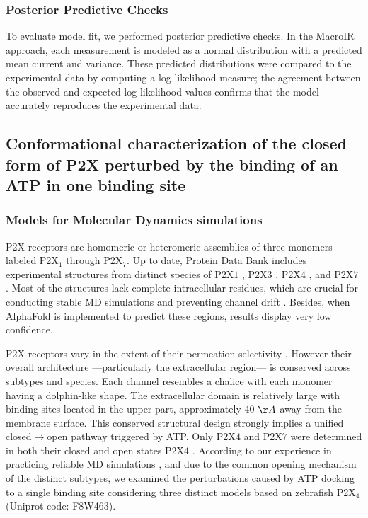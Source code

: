 \documentclass[pdflatex,sn-nature]{sn-jnl}%
\begin{document}
\subsubsection{Posterior Predictive Checks}  
To evaluate model fit, we performed posterior predictive checks. In the MacroIR approach, each measurement is modeled as a normal distribution with a predicted mean current and variance. These predicted distributions were compared to the experimental data by computing a log-likelihood measure; the agreement between the observed and expected log-likelihood values confirms that the model accurately reproduces the experimental data.

\subsection{Conformational characterization of the closed form of P2X perturbed by the binding of an ATP in one binding site}

\subsubsection{Models for Molecular Dynamics simulations}
\label{sec:model_const}

P2X receptors are homomeric or heteromeric assemblies of three monomers labeled P2X${_1}$ through P2X${_7}$. Up to date, Protein Data Bank includes experimental structures from distinct species of P2X${1}$ \cite{bennetts2024structural}, P2X${3}$ \cite{cristal_p2x3, wang2018,li2019,thach2025mechanistic,kim2024discovery}, P2X${4}$ \cite{abierta_p2x,cerrada_p2x,shen2023structural,shi2025human}, and P2X${7}$ \cite{mccarthy2019full,binding_zn_2016,karasawa2016,sheng2024structural,oken2024high,oken2024p2x7}. Most of the structures lack complete intracellular residues, which are crucial for conducting stable MD simulations and preventing channel drift \cite{piedominici_p2x_1}. Besides, when AlphaFold \cite{af3} is implemented to predict these regions, results display very low confidence.  


P2X receptors vary in the extent of their permeation selectivity \cite{samways2014principles}. However their overall architecture —particularly the extracellular region— is conserved across subtypes and species. 
Each channel resembles a chalice with each monomer having a dolphin-like shape. The extracellular domain is relatively large with binding sites located in the upper part, approximately 40 $\AA$ away from the membrane surface.
This conserved structural design strongly implies a unified closed$\rightarrow$open pathway triggered by ATP.
Only P2X${4}$ and P2X${7}$ were determined in both their closed and open states P2X${4}$ \cite{abierta_p2x,cerrada_p2x,mccarthy2019full,karasawa2016,sheng2024structural}. According to our experience in practicing reliable MD simulations \cite{piedominici_p2x_1,racigh2021, pierdominici2019charge,racigh2019positively}, and due to the common opening mechanism of the distinct subtypes, we examined the perturbations caused by ATP docking to a single binding site considering three distinct models based on zebrafish P2X${_4}$ (Uniprot code: F8W463).
\end{document}
